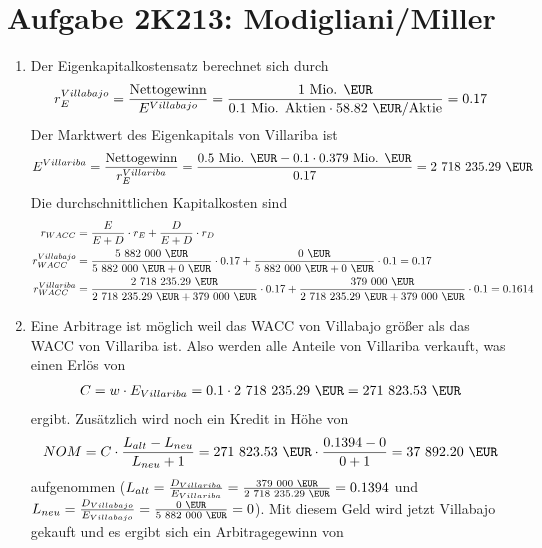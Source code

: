 \documentclass{article}
\begin{document}
	\section*{Aufgabe 2K213: Modigliani/Miller}
	\begin{enumerate}[label=(\alph*)]
		\item Der Eigenkapitalkostensatz berechnet sich durch
		\begin{align}
			r_{E}^{Villabajo} = \frac{\text{Nettogewinn}}{E^{Villabajo}} = \frac{1\text{ Mio. \EUR}}{0.1\text{ Mio. Aktien}\cdot 58.82\text{ \EUR/Aktie}} = 0.17 \notag
		\end{align}
		Der Marktwert des Eigenkapitals von Villariba ist
		\begin{align}
			E^{Villariba} = \frac{\text{Nettogewinn}}{r_{E}^{Villariba}} = \frac{0.5\text{ Mio. \EUR} - 0.1\cdot 0.379\text{ Mio. \EUR}}{0.17} = \text{2 718 235.29 \EUR} \notag
		\end{align}
		Die durchschnittlichen Kapitalkosten sind
		\begin{align}
			r_{WACC} &= \frac{E}{E+D}\cdot r_E + \frac{D}{E+D}\cdot r_D \notag \\
			r_{WACC}^{Villabajo} &= \frac{\text{5 882 000 \EUR}}{\text{5 882 000 \EUR} + 0 \text{ \EUR}} \cdot 0.17 + \frac{0\text{ \EUR}}{\text{5 882 000 \EUR} + 0 \text{ \EUR}} \cdot 0.1 = 0.17 \notag \\
			r_{WACC}^{Villariba} &= \frac{\text{2 718 235.29 \EUR}}{\text{2 718 235.29 \EUR} + \text{379 000 \EUR}} \cdot 0.17 + \frac{\text{379 000 \EUR}}{\text{2 718 235.29 \EUR} + \text{379 000 \EUR}} \cdot 0.1 = 0.1614 \notag
		\end{align}
		\item Eine Arbitrage ist möglich weil das WACC von Villabajo größer als das WACC von Villariba ist. Also werden alle Anteile von Villariba verkauft, was einen Erlös von
		\begin{align}
			C = w\cdot E_{Villariba} = 0.1\cdot \text{2 718 235.29 \EUR} = \text{271 823.53 \EUR} \notag
		\end{align}
		ergibt. Zusätzlich wird noch ein Kredit in Höhe von
		\begin{align}
			NOM = C\cdot \frac{L_{alt} - L_{neu}}{L_{neu} + 1} = \text{271 823.53 \EUR}\cdot\frac{0.1394-0}{0+1} = \text{37 892.20 \EUR} \notag
		\end{align}
		aufgenommen ($L_{alt}=\frac{D_{Villariba}}{E_{Villariba}}=\frac{\text{379 000 \EUR}}{\text{2 718 235.29 \EUR}}=0.1394$ und $L_{neu}=\frac{D_{Villabajo}}{E_{Villabajo}}=\frac{0\text{ \EUR}}{\text{5 882 000 \EUR}}=0$). Mit diesem Geld wird jetzt Villabajo gekauft und es ergibt sich ein Arbitragegewinn von

\end{enumerate}
\end{document}

